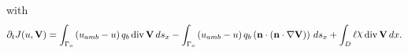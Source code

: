 \documentclass[preview]{standalone}
\let\oldcdot\cdot
\let\cdot\oldcdot
\begin{document}
with
\begin{dmath*}
\partial_{t} J(u,{\mathbf V}) =  \int_{\Gamma_o} \left(u_{amb} - u\right) q_{b} \operatorname{div} {\mathbf V} \,ds_x -  \int_{\Gamma_o} \left(u_{amb} - u\right) q_{b} \left( \mathbf n \cdot \left( \mathbf n \cdot  \nabla {\mathbf V}  \right) \right) \,ds_x +  \int_{D} \ell \raisebox{\depth}{$\chi$} \operatorname{div} {\mathbf V} \,dx.
 \end{dmath*}
\end{document}

